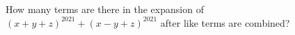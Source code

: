 How many terms are there in the expansion of $(x+y+z)^{2021}+(x-y+z)^{2021}$ after like terms are combined?
